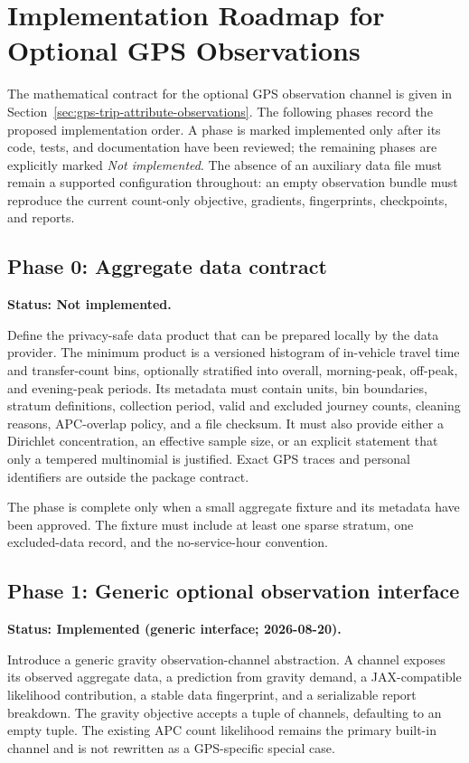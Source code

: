 \section{Implementation Roadmap for Optional GPS Observations}
\label{sec:gps-observation-implementation-roadmap}

The mathematical contract for the optional GPS observation channel is given in
Section~\ref{sec:gps-trip-attribute-observations}.  The following phases record
the proposed implementation order.  A phase is marked implemented only after
its code, tests, and documentation have been reviewed; the remaining phases
are explicitly marked \emph{Not implemented}.  The absence of an auxiliary
data file must remain a supported
configuration throughout: an empty observation bundle must reproduce the
current count-only objective, gradients, fingerprints, checkpoints, and
reports.

\subsection{Phase 0: Aggregate data contract}
\label{sec:gps-implementation-phase-0}
\textbf{Status: Not implemented.}

Define the privacy-safe data product that can be prepared locally by the data
provider.  The minimum product is a versioned histogram of in-vehicle travel
time and transfer-count bins, optionally stratified into overall, morning-peak,
off-peak, and evening-peak periods.  Its metadata must contain units, bin
boundaries, stratum definitions, collection period, valid and excluded journey
counts, cleaning reasons, APC-overlap policy, and a file checksum.  It must also
provide either a Dirichlet concentration, an effective sample size, or an
explicit statement that only a tempered multinomial is justified.  Exact GPS
traces and personal identifiers are outside the package contract.

The phase is complete only when a small aggregate fixture and its metadata have
been approved.  The fixture must include at least one sparse stratum, one
excluded-data record, and the no-service-hour convention.

\subsection{Phase 1: Generic optional observation interface}
\label{sec:gps-implementation-phase-1}
\textbf{Status: Implemented (generic interface; 2026-08-20).}

Introduce a generic gravity observation-channel abstraction.  A channel exposes
its observed aggregate data, a prediction from gravity demand, a JAX-compatible
likelihood contribution, a stable data fingerprint, and a serializable report
breakdown.  The gravity objective accepts a tuple of channels, defaulting to an
empty tuple.  The existing APC count likelihood remains the primary built-in
channel and is not rewritten as a GPS-specific special case.

